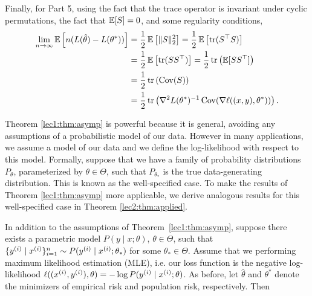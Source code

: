 Finally, for Part 5, using the fact that the trace operator is invariant under cyclic permutations, the fact that $\Exp [S] = 0$, and some regularity conditions,
\begin{align}
    \lim_{n \to \infty} \Exp \left[ n (L(\hat \theta) - L(\theta^*)) \right] &= \frac12 \Exp\left[ \|S\|_2^2 \right] = \frac12 \Exp \left[ \tr(S^\top S) \right] \\
    &= \frac12 \Exp \left[ \tr(S S^\top) \right]  = \frac12 \tr \left(\Exp[S S^\top] \right) \\
    &= \frac12 \tr \left( \Cov(S) \right) \\
    &= \frac12 \tr\left( \nabla^2 L(\theta^*)^{-1} \Cov(\nabla \ell ((x, y), \theta^*)) \right).
\end{align}


Theorem \ref{lec1:thm:asymp} is powerful because it is general, avoiding any assumptions of a probabilistic model of our data. However in many applications, we assume a model of our data and we define the log-likelihood with respect to this model. Formally, suppose that we have a family of probability distributions $P_\theta$, parameterized by $\theta \in \Theta$, such that $P_{\theta_*}$ is the true data-generating distribution. This is known as the well-specified case. To make the results of Theorem \ref{lec1:thm:asymp} more applicable, we derive analogous results for this well-specified case in Theorem \ref{lec2:thm:applied}.

\begin{theorem}
\label{lec2:thm:applied}
    In addition to the assumptions of Theorem~\ref{lec1:thm:asymp}, suppose there exists a parametric model $P(y \mid x; \theta)$, $\theta \in \Theta$, such that $\{ y\sp{i} \mid x\sp{i} \}_{i=1}^n \sim P( y\sp{i} \mid x\sp{i} ; \theta_*)$ for some $\theta_* \in \Theta$. Assume that we performing maximum likelihood estimation (MLE), i.e. our loss function is the negative log-likelihood $\ell((x\sp{i}, y\sp{i}), \theta) = - \log P( y\sp{i} \mid x\sp{i} ; \theta)$. As before, let $\hat\theta$ and $\theta^*$ denote the minimizers of empirical risk and population risk, respectively. Then
    \al{
    \label{lec2:eqn:applied1}
        \theta^* = \theta_*,
    }
\end{theorem}

